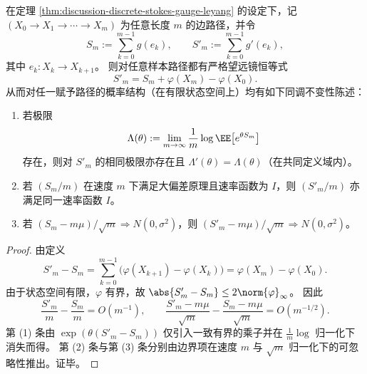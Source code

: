 \begin{corollary}[热力学极限与大偏差的同调不变性]\label{cor:discussion-thermo-ldp-homology-invariance}
在定理 \ref{thm:discussion-discrete-stokes-gauge-leyang} 的设定下，记 \((X_0\to X_1\to\cdots\to X_m)\) 为任意长度 \(m\) 的边路径，并令
\[
  S_m:=\sum_{k=0}^{m-1}g(e_k),\qquad
  S'_m:=\sum_{k=0}^{m-1}g'(e_k),
\]
其中 \(e_k:X_k\to X_{k+1}\)。
则对任意样本路径都有严格望远镜恒等式
\[
  S'_m=S_m+\varphi(X_m)-\varphi(X_0).
\]
从而对任一赋予路径的概率结构（在有限状态空间上）均有如下同调不变性陈述：
\begin{enumerate}
  \item 若极限
  \[
    \Lambda(\theta):=\lim_{m\to\infty}\frac1m\log\EE\bigl[e^{\theta S_m}\bigr]
  \]
  存在，则对 \(S'_m\) 的相同极限亦存在且 \(\Lambda'(\theta)=\Lambda(\theta)\)（在共同定义域内）。
  \item 若 \((S_m/m)\) 在速度 \(m\) 下满足大偏差原理且速率函数为 \(I\)，则 \((S'_m/m)\) 亦满足同一速率函数 \(I\)。
  \item 若 \((S_m-m\mu)/\sqrt m\Rightarrow N(0,\sigma^2)\)，则 \((S'_m-m\mu)/\sqrt m\Rightarrow N(0,\sigma^2)\)。
\end{enumerate}
\end{corollary}

\begin{proof}
由定义
\[
  S'_m-S_m=\sum_{k=0}^{m-1}\bigl(\varphi(X_{k+1})-\varphi(X_k)\bigr)=\varphi(X_m)-\varphi(X_0).
\]
由于状态空间有限，\(\varphi\) 有界，故 \(\abs{S'_m-S_m}\le 2\norm{\varphi}_\infty\)。
因此
\[
  \frac{S'_m}{m}-\frac{S_m}{m}=O(m^{-1}),
  \qquad
  \frac{S'_m-m\mu}{\sqrt m}-\frac{S_m-m\mu}{\sqrt m}=O(m^{-1/2}).
\]
第 (1) 条由 \(\exp(\theta(S'_m-S_m))\) 仅引入一致有界的乘子并在 \(\frac1m\log\) 归一化下消失而得。
第 (2) 条与第 (3) 条分别由边界项在速度 \(m\) 与 \(\sqrt m\) 归一化下的可忽略性推出。证毕。
\end{proof}

